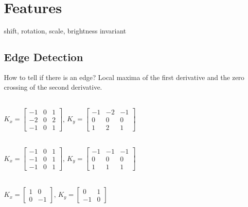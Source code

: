 \section{Features}
 shift, rotation, scale, brightness invariant
\subsection*{Edge Detection}
How to tell if there is an edge? Local maxima of the first derivative and the zero crossing of the second derivative.\\

\\
$K_x = \begin{bmatrix}
        -1 & 0 & 1\\
        -2 & 0 & 2\\
        -1 & 0 & 1
\end{bmatrix}$,
$K_y = \begin{bmatrix}
        -1 & -2 & -1\\
        0 & 0 & 0\\
        1 & 2 & 1
\end{bmatrix}$

\\
$K_x = \begin{bmatrix}
        -1 & 0 & 1\\
        -1 & 0 & 1\\
        -1 & 0 & 1
\end{bmatrix}$,
$K_y = \begin{bmatrix}
        -1 & -1 & -1\\
        0 & 0 & 0\\
        1 & 1 & 1
\end{bmatrix}$

\\
$K_x = \begin{bmatrix}
        1 & 0\\
        0 & -1
\end{bmatrix}$,
$K_y = \begin{bmatrix}
        0 & 1\\
        -1 & 0
\end{bmatrix}$


